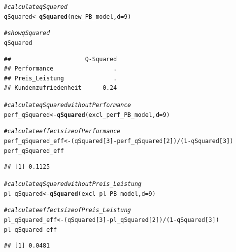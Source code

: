 \documentclass{article}\usepackage[]{graphicx}\usepackage[]{color}
\makeatletter
\newcommand{\hlnum}[1]{\textcolor[rgb]{0.686,0.059,0.569}{#1}}%
\newcommand{\hlcom}[1]{\textcolor[rgb]{0.678,0.584,0.686}{\textit{#1}}}%
\newcommand{\hlopt}[1]{\textcolor[rgb]{0,0,0}{#1}}%
\newcommand{\hlstd}[1]{\textcolor[rgb]{0.345,0.345,0.345}{#1}}%
\newcommand{\hlkwb}[1]{\textcolor[rgb]{0.69,0.353,0.396}{#1}}%
\newcommand{\hlkwc}[1]{\textcolor[rgb]{0.333,0.667,0.333}{#1}}%
\newcommand{\hlkwd}[1]{\textcolor[rgb]{0.737,0.353,0.396}{\textbf{#1}}}%
\newenvironment{kframe}{%
 \def\at@end@of@kframe{}%
 \ifinner\ifhmode%
  \def\at@end@of@kframe{\end{minipage}}%
  \begin{minipage}{\columnwidth}%
 \fi\fi%
 \def\FrameCommand##1{\hskip\@totalleftmargin \hskip-\fboxsep
 \colorbox{shadecolor}{##1}\hskip-\fboxsep
     \hskip-\linewidth \hskip-\@totalleftmargin \hskip\columnwidth}%
 \MakeFramed {\advance\hsize-\width
   \@totalleftmargin\z@ \linewidth\hsize
   \@setminipage}}%
 {\par\unskip\endMakeFramed%
 \at@end@of@kframe}
\newenvironment{knitrout}{}{} %
\makeatother
\begin{document}
\begin{knitrout}
\color{fgcolor}\begin{kframe}
\begin{alltt}
\hlcom{#calculate qSquared}
\hlstd{qSquared} \hlkwb{<-} \hlkwd{qSquared}\hlstd{(new_PB_model,} \hlkwc{d}\hlstd{=}\hlnum{9}\hlstd{)}

\hlcom{#show qSquared}
\hlstd{qSquared}
\end{alltt}
\begin{verbatim}
##                     Q-Squared
## Performance                 .
## Preis_Leistung              .
## Kundenzufriedenheit      0.24
\end{verbatim}
\begin{alltt}
\hlcom{#calculate qSquared without Performance}
\hlstd{perf_qSquared} \hlkwb{<-} \hlkwd{qSquared}\hlstd{(excl_perf_PB_model,} \hlkwc{d}\hlstd{=}\hlnum{9}\hlstd{)}

\hlcom{#calculate effect size of Performance}
\hlstd{perf_qSquared_eff} \hlkwb{<-} \hlstd{(qSquared[}\hlnum{3}\hlstd{]}\hlopt{-}\hlstd{perf_qSquared[}\hlnum{2}\hlstd{])}\hlopt{/}\hlstd{(}\hlnum{1}\hlopt{-}\hlstd{qSquared[}\hlnum{3}\hlstd{])}
\hlstd{perf_qSquared_eff}
\end{alltt}
\begin{verbatim}
## [1] 0.1125
\end{verbatim}
\begin{alltt}
\hlcom{#calculate qSquared without Preis_Leistung}
\hlstd{pl_qSquared} \hlkwb{<-} \hlkwd{qSquared}\hlstd{(excl_pl_PB_model,} \hlkwc{d}\hlstd{=}\hlnum{9}\hlstd{)}

\hlcom{#calculate effect size of Preis_Leistung}
\hlstd{pl_qSquared_eff} \hlkwb{<-} \hlstd{(qSquared[}\hlnum{3}\hlstd{]}\hlopt{-}\hlstd{pl_qSquared[}\hlnum{2}\hlstd{])}\hlopt{/}\hlstd{(}\hlnum{1}\hlopt{-}\hlstd{qSquared[}\hlnum{3}\hlstd{])}
\hlstd{pl_qSquared_eff}
\end{alltt}
\begin{verbatim}
## [1] 0.0481
\end{verbatim}
\end{kframe}
\end{knitrout}
\end{document}
